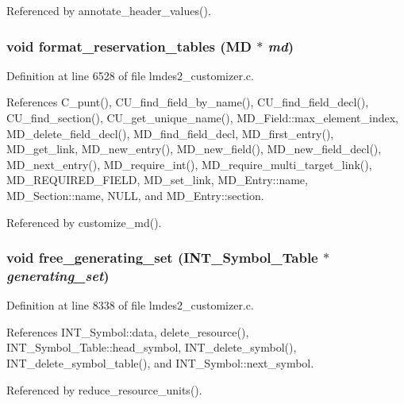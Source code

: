 Referenced by annotate\_\-header\_\-values().
\subsubsection{\setlength{\rightskip}{0pt plus 5cm}void format\_\-reservation\_\-tables (\bf{MD} $\ast$ {\em md})}\label{lmdes2__customizer_8c_7633a9393e597832a6f16c70d882d3b5}




Definition at line 6528 of file lmdes2\_\-customizer.c.

References C\_\-punt(), CU\_\-find\_\-field\_\-by\_\-name(), CU\_\-find\_\-field\_\-decl(), CU\_\-find\_\-section(), CU\_\-get\_\-unique\_\-name(), MD\_\-Field::max\_\-element\_\-index, MD\_\-delete\_\-field\_\-decl(), MD\_\-find\_\-field\_\-decl, MD\_\-first\_\-entry(), MD\_\-get\_\-link, MD\_\-new\_\-entry(), MD\_\-new\_\-field(), MD\_\-new\_\-field\_\-decl(), MD\_\-next\_\-entry(), MD\_\-require\_\-int(), MD\_\-require\_\-multi\_\-target\_\-link(), MD\_\-REQUIRED\_\-FIELD, MD\_\-set\_\-link, MD\_\-Entry::name, MD\_\-Section::name, NULL, and MD\_\-Entry::section.

Referenced by customize\_\-md().
\subsubsection{\setlength{\rightskip}{0pt plus 5cm}void free\_\-generating\_\-set (\bf{INT\_\-Symbol\_\-Table} $\ast$ {\em generating\_\-set})}\label{lmdes2__customizer_8c_4327d8c541da78d5f3f9cf53831da30d}




Definition at line 8338 of file lmdes2\_\-customizer.c.

References INT\_\-Symbol::data, delete\_\-resource(), INT\_\-Symbol\_\-Table::head\_\-symbol, INT\_\-delete\_\-symbol(), INT\_\-delete\_\-symbol\_\-table(), and INT\_\-Symbol::next\_\-symbol.

Referenced by reduce\_\-resource\_\-units().
